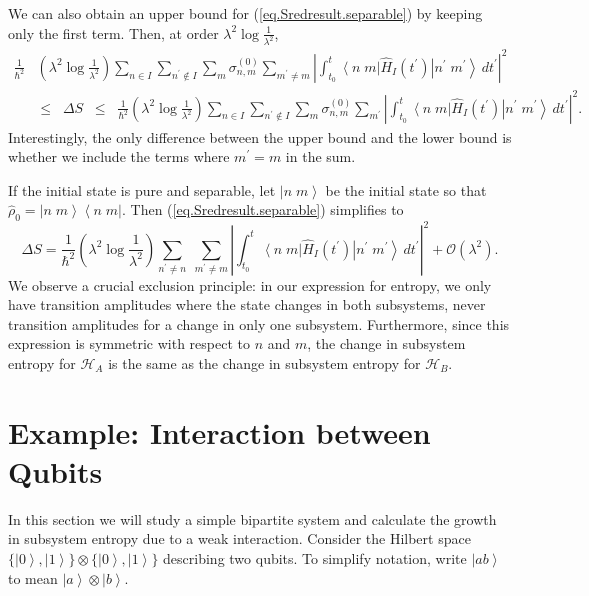\documentclass[11pt]{article}
\newcounter{subsubsubsection}[subsubsection]
\newcommand{\Od}[1]{\mathcal{O}{\left(#1\right)}}
\newcommand{\bra}[1]{\left\langle#1\right|}
\newcommand{\ket}[1]{\left|#1\right\rangle}
\newcommand{\hilb}{\mathcal{H}}
\newcommand{\op}[1]{\hat{#1}}
\newcommand{\bket}[2]{\ket{#1\;#2}}
\newcommand{\bbra}[2]{\bra{#1\;#2}}
\theoremstyle{theorem}
\theoremstyle{remark}
\theoremstyle{step}
\theoremstyle{gap}
\begin{document}
We can also obtain an upper bound for (\ref{eq.Sredresult.separable}) by keeping only the first term. Then, at order \(\lambda^2 \log \frac{1}{\lambda^2}\),
\begin{align}\label{eq.dSbounds}
\frac{1}{\hbar^2}&\left(\lambda^2 \log\frac{1}{\lambda^2}\right) \sum_{n\in I}\sum_{n^\prime \not\in I} \sum_m \sigma_{n,m}^{(0)} \sum_{m^\prime \neq m} \left|\int_{t_0}^t \bbra{n}{m}\op{H}_I (t^{\prime})\bket{n^\prime}{m^\prime} \,dt^{\prime}\right|^2 \\
&\leq \;\;\Delta S \;\;\leq\;\; \frac{1}{\hbar^2}\left(\lambda^2 \log\frac{1}{\lambda^2}\right) \sum_{n\in I}\sum_{n^\prime \not\in I} \sum_m \sigma_{n,m}^{(0)} \sum_{m^\prime} \left|\int_{t_0}^t \bbra{n}{m}\op{H}_I (t^{\prime})\bket{n^\prime}{m^\prime} \,dt^{\prime}\right|^2. \nonumber
\end{align}
Interestingly, the only difference between the upper bound and the lower bound is whether we include the terms where \(m^\prime = m\) in the sum.


If the initial state is pure and separable, let \(\bket{n}{m}\) be the initial state so that \(\op{\rho}_0 = \bket{n}{m}\bbra{n}{m}\). Then (\ref{eq.Sredresult.separable}) simplifies to
\begin{equation}\label{eq.Sredresult.separablepure}
\Delta S =\frac{1}{\hbar^2}\left(\lambda^2 \log\frac{1}{\lambda^2}\right) \sum_{n^\prime\neq n} \;\sum_{m^\prime\neq m} \left|\int_{t_0}^t \bbra{n}{m} \op{H}_I (t^{\prime})\bket{n^\prime}{m^\prime} \,dt^{\prime}\right|^2 + \Od{\lambda^2}.
\end{equation}
We observe a crucial exclusion principle: in our expression for entropy, we only have transition amplitudes where the state changes in both subsystems, never transition amplitudes for a change in only one subsystem. Furthermore, since this expression is symmetric with respect to \(n\) and \(m\), the change in subsystem entropy for \(\hilb_A\) is the same as the change in subsystem entropy for \(\hilb_B\).


\section{Example: Interaction between Qubits}

In this section we will study a simple bipartite system and calculate the growth in subsystem entropy due to a weak interaction. Consider the Hilbert space \(\{\ket{0}, \ket{1}\}\otimes\{\ket{0}, \ket{1}\}\) describing two qubits. To simplify notation, write \(\ket{ab}\) to mean \(\ket{a}\otimes\ket{b}\).
\end{document}

